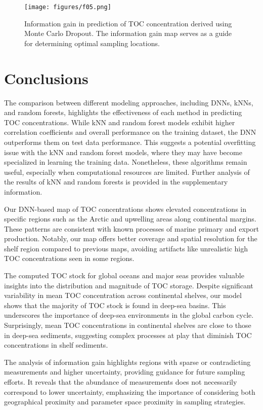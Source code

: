 \documentclass[journal abbreviation, manuscript]{copernicus}
\begin{document}
\begin{figure}
    \centering
    \texttt{[image: figures/f05.png]}
    \caption{Information gain in prediction of TOC concentration derived using Monte Carlo Dropout. The information gain map serves as a guide for determining optimal sampling locations.}
    \label{fig:informationgain}
\end{figure}



\section{Conclusions}  %
The comparison between different modeling approaches, including DNNs, kNNs, and random forests, highlights the effectiveness of each method in predicting TOC concentrations. While kNN and random forest models exhibit higher correlation coefficients and overall performance on the training dataset, the DNN outperforms them on test data performance. This suggests a potential overfitting issue with the kNN and random forest models, where they may have become specialized in learning the training data. Nonetheless, these algorithms remain useful, especially when computational resources are limited. Further analysis of the results of kNN and random forests is provided in the supplementary information.

Our DNN-based map of TOC concentrations shows elevated concentrations in specific regions such as the Arctic and upwelling areas along continental margins. These patterns are consistent with known processes of marine primary and export production. Notably, our map offers better coverage and spatial resolution for the shelf region compared to previous maps, avoiding artifacts like unrealistic high TOC concentrations seen in some regions.

The computed TOC stock for global oceans and major seas provides valuable insights into the distribution and magnitude of TOC storage. Despite significant variability in mean TOC concentration across continental shelves, our model shows that the majority of TOC stock is found in deep-sea basins. This underscores the importance of deep-sea environments in the global carbon cycle. Surprisingly, mean TOC concentrations in continental shelves are close to those in deep-sea sediments, suggesting complex processes at play that diminish TOC concentrations in shelf sediments.

The analysis of information gain highlights regions with sparse or contradicting measurements and higher uncertainty, providing guidance for future sampling efforts. It reveals that the abundance of measurements does not necessarily correspond to lower uncertainty, emphasizing the importance of considering both geographical proximity and parameter space proximity in sampling strategies.
\end{document}
